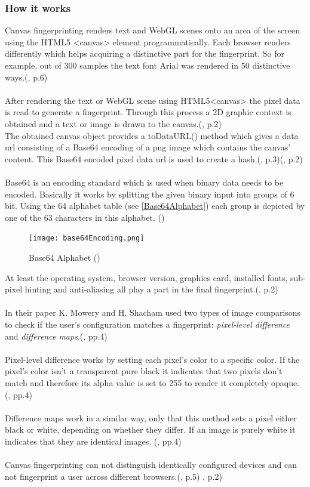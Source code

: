 \subsubsection{How it works}
Canvas fingerprinting renders text and WebGL scenes onto an area of the screen using the HTML5 <canvas> element programmatically. Each browser renders differently which helps acquiring a distinctive part for the fingerprint. So for example, out of 300 samples the text font Arial was rendered in 50 distinctive ways.(\textcite{mowery12}, p.6)\\\\
After rendering the text or WebGL scene using HTML5<canvas> the pixel data is read to generate a fingerprint. Through this process a 2D graphic context is obtained and a text or image is drawn to the canvas.(\textcite{upi15}, p.2)\\
The obtained canvas object provides a toDataURL() method which gives a data url consisting of a Base64 encoding of a png image which contains the canvas' content. This Base64 encoded pixel data url is used to create a hash.(\textcite{mowery12}, p.3)(\textcite{upi15}, p.2)\\\\
Base64 is an encoding standard which is used when binary data needs to be encoded. Basically it works by splitting the given binary input into groups of 6 bit. Using the 64 alphabet table (see \autoref{Base64Alphabet}) each group is depicted by one of the 63 characters in this alphabet.
(\textcite{josef06})
\begin{figure}[H]
	\centering
	\texttt{[image: base64Encoding.png]}
	\caption{Base64 Alphabet (\textcite{Base64Alphabet})}
	\label{Base64Alphabet}
\end{figure}
At least the operating system, browser version, graphics card, installed fonts, sub-pixel hinting and anti-aliasing all play a part in the final fingerprint.(\textcite{upi15}, p.2) \\\\
In their paper K. Mowery and H. Shacham used two types of image comparisons to check if the user's configuration matches a fingerprint: \textit{pixel-level difference} and \textit{difference maps}.(\textcite{mowery12}, pp.4)\\\\
Pixel-level difference works by setting each pixel's color to a specific color. If the pixel's color isn't a transparent pure black it indicates that two pixels don't match and therefore its alpha value is set to 255 to render it completely opaque. (\textcite{mowery12}, pp.4)\\\\
Difference maps work in a similar way, only that this method sets a pixel either black or white, depending on whether they differ. If an image is purely white it indicates that they are identical images. (\textcite{mowery12}, pp.4)\\\\
Canvas fingerprinting can not distinguish identically configured devices and can not fingerprint a user across different browsers.(\textcite{mowery12}, p.5) \textcite{upi15}, p.2)

